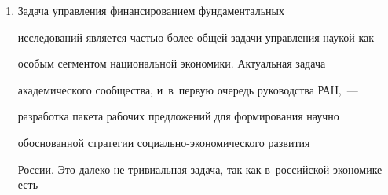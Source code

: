 \begin{multicols}{2}
\begin{enumerate}[1.]
в~структуре Системы базы совокупных данных научных организаций РАН по 

инновационным разработкам позволит в~перспективе более объективно 

подойти к~оценкам эффективности фундаментальной науки. В~мировой 

практике оценка результатов фундаментальной науки, как правило, проводится 

на основе показателей публикационной\linebreak активности и~цитирования, а~также 

экспертных оценок научного сообщества. В~настоящее\linebreak время российским 

научным и~экономическим сообществом не выработаны единые подходы\linebreak 

к~оценке эффективности фундаментальной\linebreak науки. Очевидно, что уровень 

развития отече\-ственной промышленности, особенно ее %

 высокотехнологичного 

сектора, т.\,е.\ ее <<платеже\-способный спрос>> на результаты исследований\linebreak 

и~разработок, будет существенно влиять на оценку эффективности 

фундаментальной науки. (По статистике РФФИ каждый десятый завершенный 

проект имеет прикладной инновационный потенциал и~коммерческую, 

рыночную перспективу.) 

    \item  Задача управления финансированием фундаментальных 

исследований является частью более общей задачи управления наукой как 

особым сегментом национальной экономики. Актуаль\-ная задача 

академического сообщества, и~в~первую очередь руководства РАН,~---

разработка пакета рабочих предложений для формирования научно 

обоснованной стратегии со\-ци\-аль\-но-эко\-но\-ми\-че\-ско\-го развития 

России. Это далеко не тривиальная задача, так как в~российской экономике есть 


\end{enumerate}
\end{multicols}
